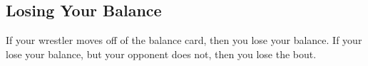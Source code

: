 \subsection*{Losing Your Balance}
If your wrestler moves off of the balance card, then you lose your balance. If your lose your balance, but your opponent does not, then you lose the bout.